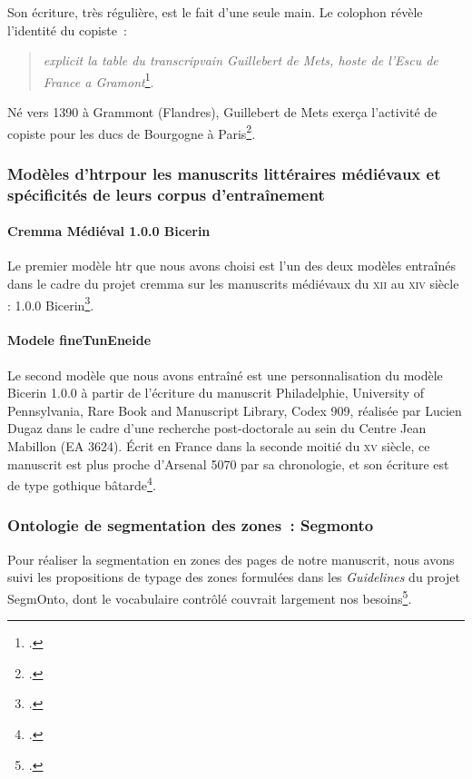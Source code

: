 \documentclass{article}
\newcommand{\siecle}[1]{\textsc{#1}\ieme}
\begin{document}
Son écriture, très régulière, est le fait d'une seule main. Le colophon révèle l'identité du copiste~: \begin{quote}
	\textit{explicit la table du transcripvain Guillebert de Mets, hoste de l'Escu de France a Gramont}\footcite{irhtsectionromaneNoticeParisBibliotheque2012}.
\end{quote}Né vers 1390 à Grammont (Flandres), Guillebert de Mets exerça l'activité de copiste pour les ducs de Bourgogne à Paris\footcite{irhtsectionromaneGuillebertMets}. 

\subsubsection{Modèles d'\gls{htr}pour les manuscrits littéraires médiévaux et spécificités de leurs corpus d'entraînement}
\paragraph{Cremma Médiéval 1.0.0 Bicerin}
Le premier modèle \gls{htr} que nous avons choisi est l'un des deux modèles entraînés dans le cadre du projet \gls{cremma} sur les manuscrits médiévaux du \siecle{xii} au \siecle{xiv} siècle : 1.0.0 Bicerin\footcite{pincheCREMMAMedievalOld2021}.

\paragraph{Modele fineTunEneide}
Le second modèle que nous avons entraîné est une personnalisation du modèle Bicerin 1.0.0 à partir de l'écriture du manuscrit Philadelphie, University of Pennsylvania, Rare Book and Manuscript Library, Codex 909, réalisée par Lucien Dugaz dans le cadre d'une recherche post-doctorale au sein du Centre Jean Mabillon (EA 3624). Écrit en France dans la seconde moitié du \siecle{xv} siècle, ce manuscrit est plus proche d'Arsenal 5070 par sa chronologie, et son écriture est de type gothique bâtarde\footcite{dugazEditionCritiqueNumerique2021, MedievalRenaissanceManuscripts}.

\subsubsection{Ontologie de segmentation des zones~: Segmonto}
Pour réaliser la segmentation en zones des pages de notre manuscrit, nous avons suivi les propositions de typage des zones formulées dans les \textit{Guidelines} du projet SegmOnto, dont le vocabulaire contrôlé couvrait largement nos besoins\footcite{campsSegmOntoGuidelines2021}.
\end{document}
